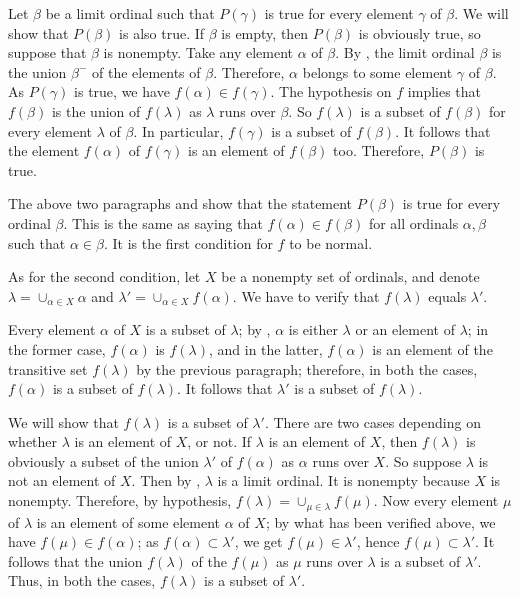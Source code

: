 \documentclass{article}
\begin{document}
\begin{solution}[\ref{exe:1npoplek}]
  Let \(\beta\) be a limit ordinal such that \(P(\gamma)\) is true for
  every element \(\gamma\) of \(\beta\).  We will show that
  \(P(\beta)\) is also true.  If \(\beta\) is empty, then \(P(\beta)\)
  is obviously true, so suppose that \(\beta\) is nonempty.  Take any
  element \(\alpha\) of \(\beta\).  By , the limit
  ordinal \(\beta\) is the union \(\beta^-\) of the elements of
  \(\beta\).  Therefore, \(\alpha\) belongs to some element \(\gamma\)
  of \(\beta\).  As \(P(\gamma)\) is true, we have
  \(f(\alpha) \in f(\gamma)\).  The hypothesis on \(f\) implies that
  \(f(\beta)\) is the union of \(f(\lambda)\) as \(\lambda\) runs over
  \(\beta\).  So \(f(\lambda)\) is a subset of \(f(\beta)\) for every
  element \(\lambda\) of \(\beta\).  In particular, \(f(\gamma)\) is a
  subset of \(f(\beta)\).  It follows that the element \(f(\alpha)\)
  of \(f(\gamma)\) is an element of \(f(\beta)\) too.  Therefore,
  \(P(\beta)\) is true.

  The above two paragraphs and  show that the
  statement \(P(\beta)\) is true for every ordinal \(\beta\).  This is
  the same as saying that \(f(\alpha) \in f(\beta)\) for all ordinals
  \(\alpha, \beta\) such that \(\alpha \in \beta\).  It is the first
  condition for \(f\) to be normal.

  As for the second condition, let \(X\) be a nonempty set of
  ordinals, and denote \(\lambda = \cup_{\alpha \in X} \alpha\) and
  \(\lambda' = \cup_{\alpha \in X} f(\alpha)\).  We have to verify
  that \(f(\lambda)\) equals \(\lambda'\).

  Every element \(\alpha\) of \(X\) is a subset of \(\lambda\); by
  , \(\alpha\) is either \(\lambda\) or an element
  of \(\lambda\); in the former case, \(f(\alpha)\) is \(f(\lambda)\),
  and in the latter, \(f(\alpha)\) is an element of the transitive set
  \(f(\lambda)\) by the previous paragraph; therefore, in both the
  cases, \(f(\alpha)\) is a subset of \(f(\lambda)\).  It follows that
  \(\lambda'\) is a subset of \(f(\lambda)\).

  We will show that \(f(\lambda)\) is a subset of \(\lambda'\).  There
  are two cases depending on whether \(\lambda\) is an element of
  \(X\), or not.  If \(\lambda\) is an element of \(X\), then
  \(f(\lambda)\) is obviously a subset of the union \(\lambda'\) of
  \(f(\alpha)\) as \(\alpha\) runs over \(X\).  So suppose \(\lambda\)
  is not an element of \(X\).  Then by ,
  \(\lambda\) is a limit ordinal.  It is nonempty because \(X\) is
  nonempty.  Therefore, by hypothesis,
  \(f(\lambda) = \cup_{\mu \in \lambda} f(\mu)\).  Now every element
  \(\mu\) of \(\lambda\) is an element of some element \(\alpha\) of
  \(X\); by what has been verified above, we have
  \(f(\mu) \in f(\alpha)\); as \(f(\alpha) \subset \lambda'\), we get
  \(f(\mu) \in \lambda'\), hence \(f(\mu) \subset \lambda'\).  It
  follows that the union \(f(\lambda)\) of the \(f(\mu)\) as \(\mu\)
  runs over \(\lambda\) is a subset of \(\lambda'\).  Thus, in both
  the cases, \(f(\lambda)\) is a subset of \(\lambda'\).


\end{solution}
\end{document}
